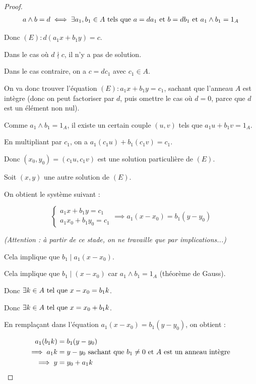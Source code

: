 \documentclass[12pt,a4paper]{report}
\begin{document}
\begin{proof}
    \begin{align*}
        a \wedge b = d &\iff \exists a_1,b_1 \in A \text{ tels que } a = da_1 \text{ et } b = db_1 \text{ et } a_1 \wedge b_1 = 1_A\\
    \end{align*}

    Donc $(E) : d(a_1 x + b_1 y) = c$.

    Dans le cas où $d\nmid c$, il n'y a pas de solution.

    Dans le cas contraire, on a $c = d c_1$ avec $c_1 \in A$.

    On va donc trouver l'équation $(E) : a_1 x + b_1 y = c_1$, sachant que l'anneau $A$ est intègre (donc on peut factoriser par $d$, puis omettre le cas où $d=0$, parce que $d$ est un élément non nul).

    Comme $a_1 \wedge b_1 = 1_A$, il existe un certain couple $(u,v)$ tels que $a_1 u + b_1 v = 1_A$.

    En multipliant par $c_1$, on a $a_1 (c_1 u) + b_1 (c_1 v) = c_1$.

    Donc $(x_0,y_0) = (c_1 u, c_1 v)$ est une solution particulière de $(E)$.

    Soit $(x,y)$ une autre solution de $(E)$.

    On obtient le système suivant :

    $$\begin{cases}
    a_1 x + b_1 y = c_1\\
    a_1 x_0 + b_1 y_0 = c_1
    \end{cases}\implies
    a_1(x - x_0) = b_1 (y - y_0)
    $$

    \begin{center}
    \textit{(Attention : à partir de ce stade, on ne travaille que par implications...)}
    \end{center}

    Cela implique que $b_1 \mid a_1 (x - x_0)$.

    Cela implique que $b_1 \mid (x - x_0)$ car $a_1 \wedge b_1 = 1_A$ (théorème de Gauss).

    Donc $\exists k \in A \text{ tel que } x - x_0 = b_1 k$.

    Donc $\exists k \in A \text{ tel que } x = x_0 + b_1 k$.

    En remplaçant dans l'équation $a_1 (x - x_0) = b_1 (y - y_0)$, on obtient :

    \begin{align*}
        a_1 (b_1 k) &= b_1 (y - y_0)\\
        \implies a_1 k &= y - y_0 \text{ sachant que } b_1 \ne 0 \text{ et } A \text{ est un anneau intègre }\\
        \implies y &= y_0 + a_1 k
    \end{align*}


\end{proof}
\end{document}

